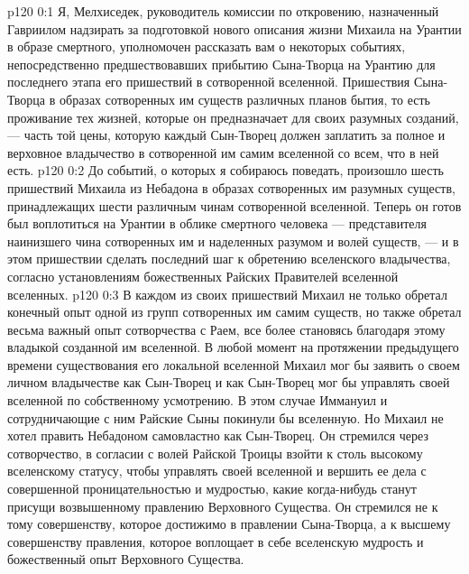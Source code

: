 \author{Мантутия Мелхиседек}
\vs p120 0:1 Я, Мелхиседек, руководитель комиссии по откровению, назначенный Гавриилом надзирать за подготовкой нового описания жизни Михаила на Урантии в образе смертного, уполномочен рассказать вам о некоторых событиях, непосредственно предшествовавших прибытию Сына\hyp{}Творца на Урантию для последнего этапа его пришествий в сотворенной вселенной. Пришествия Сына\hyp{}Творца в образах сотворенных им существ различных планов бытия, то есть проживание тех жизней, которые он предназначает для своих разумных созданий, --- часть той цены, которую каждый Сын\hyp{}Творец должен заплатить за полное и верховное владычество в сотворенной им самим вселенной со всем, что в ней есть.
\vs p120 0:2 До событий, о которых я собираюсь поведать, произошло шесть пришествий Михаила из Небадона в образах сотворенных им разумных существ, принадлежащих шести различным чинам сотворенной вселенной. Теперь он готов был воплотиться на Урантии в облике смертного человека --- представителя наинизшего чина сотворенных им и наделенных разумом и волей существ, --- и в этом пришествии сделать последний шаг к обретению вселенского владычества, согласно установлениям божественных Райских Правителей вселенной вселенных.
\vs p120 0:3 В каждом из своих пришествий Михаил не только обретал конечный опыт одной из групп сотворенных им самим существ, но также обретал весьма важный опыт сотворчества с Раем, все более становясь благодаря этому владыкой созданной им вселенной. В любой момент на протяжении предыдущего времени существования его локальной вселенной Михаил мог бы заявить о своем личном владычестве как Сын\hyp{}Творец и как Сын\hyp{}Творец мог бы управлять своей вселенной по собственному усмотрению. В этом случае Иммануил и сотрудничающие с ним Райские Сыны покинули бы вселенную. Но Михаил не хотел править Небадоном самовластно как Сын\hyp{}Творец. Он стремился через сотворчество, в согласии с волей Райской Троицы взойти к столь высокому вселенскому статусу, чтобы управлять своей вселенной и вершить ее дела с совершенной проницательностью и мудростью, какие когда\hyp{}нибудь станут присущи возвышенному правлению Верховного Существа. Он стремился не к тому совершенству, которое достижимо в правлении Сына\hyp{}Творца, а к высшему совершенству правления, которое воплощает в себе вселенскую мудрость и божественный опыт Верховного Существа.
